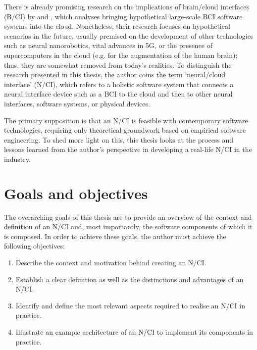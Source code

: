 There is already promising research on the implications of brain/cloud interfaces (B/CI) by \citeauthor{martins_human_2019} \parencite*{martins_human_2019} and \citeauthor{angelica_cognitive_2021} \parencite*{angelica_cognitive_2021}, which analyses bringing hypothetical large-scale BCI software systems into the cloud. Nonetheless, their research focuses on hypothetical scenarios in the future, usually premised on the development of other technologies such as neural nanorobotics, vital advances in 5G, or the presence of supercomputers in the cloud (e.g. for the augmentation of the human brain); thus, they are somewhat removed from today’s realities. To distinguish the research presented in this thesis, the author coins the term ‘neural/cloud interface’ (N/CI), which refers to a holistic software system that connects a neural interface device such as a BCI to the cloud and then to other neural interfaces, software systems, or physical devices.

The primary supposition is that an N/CI is feasible with contemporary software technologies, requiring only theoretical groundwork based on empirical software engineering. To shed more light on this, this thesis looks at the process and lessons learned from the author's perspective in developing a real-life N/CI in the industry.

\section{Goals and objectives}
\label{chapter1-goals-and-objectives}

The overarching goals of this thesis are to provide an overview of the context and definition of an N/CI and, most importantly, the software components of which it is composed. In order to achieve these goals, the author must achieve the following objectives:

\begin{enumerate}
  \item Describe the context and motivation behind creating an N/CI.
  \item Establish a clear definition as well as the distinctions and advantages of an N/CI.
  \item Identify and define the most relevant aspects required to realise an N/CI in practice.
  \item Illustrate an example architecture of an N/CI to implement its components in practice.
\end{enumerate}

